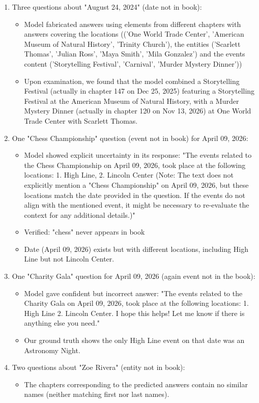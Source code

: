 \documentclass{article}
\begin{document}
\begin{enumerate}
    \item Three questions about "August 24, 2024" (date not in book):
        \begin{itemize}
        \item Model fabricated answers using elements from different chapters with answers covering the locations (('One World Trade Center', 'American Museum of Natural History', 'Trinity Church'), the entities ('Scarlett Thomas', 'Julian Ross', 'Maya Smith', 'Mila Gonzalez') and the events content ('Storytelling Festival', 'Carnival', 'Murder Mystery Dinner'))
        \item Upon examination, we found that the model combined a Storytelling Festival (actually in chapter 147 on Dec 25, 2025) featuring a Storytelling Festival at the American Museum of Natural History, with a Murder Mystery Dinner (actually in chapter 120 on Nov 13, 2026) at One World Trade Center with Scarlett Thomas.
        \end{itemize}
    \item One "Chess Championship" question (event not in book) for April 09, 2026:
        \begin{itemize}
        \item Model showed explicit uncertainty in its response: "The events related to the Chess Championship on April 09, 2026, took place at the following locations: 1. High Line, 2. Lincoln Center (Note: The text does not explicitly mention a "Chess Championship" on April 09, 2026, but these locations match the date provided in the question. If the events do not align with the mentioned event, it might be necessary to re-evaluate the context for any additional details.)"
        \item Verified: "chess" never appears in book
        \item Date (April 09, 2026) exists but with different locations, including High Line but not Lincoln Center.
        \end{itemize}
    \item One "Charity Gala" question for April 09, 2026 (again event not in the book):
        \begin{itemize}
        \item Model gave confident but incorrect answer: "The events related to the Charity Gala on April 09, 2026, took place at the following locations: 1. High Line 2. Lincoln Center. I hope this helps! Let me know if there is anything else you need."
        \item Our ground truth shows the only High Line event on that date was an Astronomy Night.
        \end{itemize}
    \item Two questions about "Zoe Rivera" (entity not in book):
        \begin{itemize}
        \item The chapters corresponding to the predicted answers contain no similar names (neither matching first nor last names).
        \end{itemize}
\end{enumerate}
\end{document}
